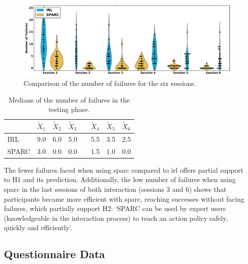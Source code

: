 \begin{figure}[ht]
	\includegraphics[width=\textwidth]{failures.pdf}
	\centering
	\caption{Comparison of the number of failures for the six sessions.
	}
	\label{fig:control_failures}
\end{figure}

\begin{table}[ht]
	\centering
	\caption{Medians of the number of failures in the testing phase.}
	\label{tab:control_failures}
	\begin{tabular}{@{}llllllll@{}}\toprule
		& $\widetilde{X}_{1}$ & $\widetilde{X}_{2}$ & $\widetilde{X}_{3}$ && $\widetilde{X}_{4}$ & $\widetilde{X}_{5}$ & $\widetilde{X}_{6}$\\ 
		\midrule
	    IRL & 9.0 & 6.0 & 5.0 &\crossarr& 5.5 & 3.5 & 2.5\\
	    SPARC & 3.0 & 0.0 & 0.0 && 1.5 & 1.0 & 0.0\\
	    \bottomrule
	\end{tabular}
\end{table}

The fewer failures faced when using \gls{sparc} compared to \gls{irl} offers partial support to H1 and its prediction. Additionally, the low number of failures when using \gls{sparc} in the last sessions of both interaction (sessions 3 and 6) shows that participants became more efficient with \gls{sparc}, reaching successes without facing failures, which partially support H2: `SPARC can be used by expert users (knowledgeable in the interaction process) to teach an action policy safely, quickly and efficiently'.

\subsection{Questionnaire Data}

